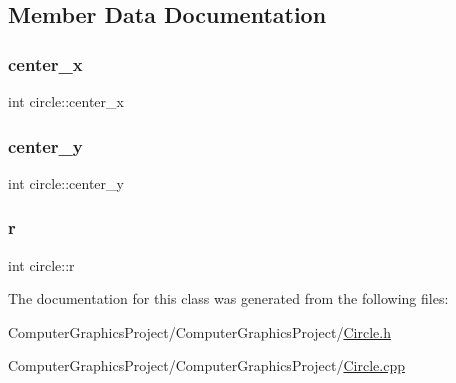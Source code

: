 \subsection{Member Data Documentation}
\mbox{\label{classcircle_acb3d4e48483b2ea9837fa75cc0977c0d}} 
\subsubsection{\texorpdfstring{center\+\_\+x}{center\_x}}
{\footnotesize\ttfamily int circle\+::center\+\_\+x\hspace{0.3cm}{\ttfamily [private]}}

\mbox{\label{classcircle_ae297efc5c3c3b7a2e6595ed74e324c88}} 
\subsubsection{\texorpdfstring{center\+\_\+y}{center\_y}}
{\footnotesize\ttfamily int circle\+::center\+\_\+y\hspace{0.3cm}{\ttfamily [private]}}

\mbox{\label{classcircle_a90f36ddf730f3c068125f9533d1cd7a1}} 
\subsubsection{\texorpdfstring{r}{r}}
{\footnotesize\ttfamily int circle\+::r\hspace{0.3cm}{\ttfamily [private]}}



The documentation for this class was generated from the following files\+:\begin{DoxyCompactItemize}
\item 
Computer\+Graphics\+Project/\+Computer\+Graphics\+Project/\hyperlink{_circle_8h}{Circle.\+h}\item 
Computer\+Graphics\+Project/\+Computer\+Graphics\+Project/\hyperlink{_circle_8cpp}{Circle.\+cpp}\end{DoxyCompactItemize}
